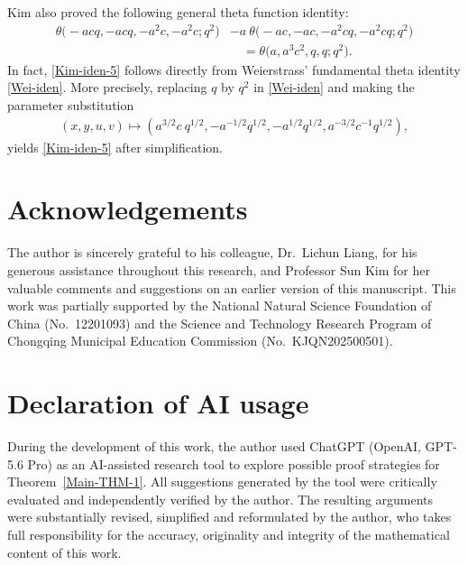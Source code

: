 \documentclass[12pt,reqno]{amsart}
\numberwithin{equation}{section}
\theoremstyle{plain}
\theoremstyle{definition}
\begin{document}
Kim \cite[Theorem~6.1]{Kim2026} also proved the following general theta function
identity:
\begin{align}
\theta\big({-}acq,-acq,-a^2c,-a^2c;q^2\big) &-a\!\:\theta\big({-}ac,-ac,-a^2cq,-a^2cq;
q^2\big)\nonumber\\
 &\quad=\theta\big(a,a^3c^2,q,q;q^2\big).\label{Kim-iden-5}
\end{align}
In fact, \eqref{Kim-iden-5} follows directly from Weierstrass' fundamental theta
identity \eqref{Wei-iden}. More precisely, replacing $q$ by $q^2$ in \eqref{Wei-iden}
and making the parameter substitution
\begin{align*}
(x,y,u,v)\mapsto(a^{3/2}c\!\:q^{1/2},-a^{-1/2}q^{1/2},-a^{1/2}q^{1/2},a^{-3/2}c^{-1}
q^{1/2}),
\end{align*}
yields \eqref{Kim-iden-5} after simplification.




\section*{Acknowledgements}

The author is sincerely grateful to his colleague, Dr.~Lichun Liang, for his generous
assistance throughout this research, and Professor Sun Kim for her valuable comments
and suggestions on an earlier version of this manuscript.
This work was partially supported by the National Natural Science Foundation of China
(No.~12201093) and the Science and Technology Research Program of Chongqing Municipal
Education Commission (No.~KJQN202500501).



\section*{Declaration of AI usage}

During the development of this work, the author used ChatGPT (OpenAI, GPT-5.6 Pro)
as an AI-assisted research tool to explore possible proof strategies for
Theorem~\ref{Main-THM-1}. All suggestions generated by the tool were critically
evaluated and independently verified by the author. The resulting arguments were substantially revised, simplified and reformulated by the author, who takes full
responsibility for the accuracy, originality and integrity of the mathematical content
of this work.
\end{document}
